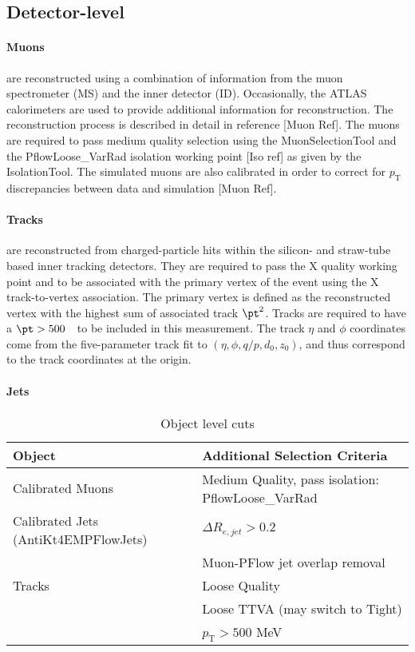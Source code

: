\subsection{Detector-level}

\paragraph{Muons} are reconstructed using a combination of information from the muon spectrometer (MS) and the inner detector (ID). Occasionally, the ATLAS calorimeters are used to provide additional information for reconstruction. The reconstruction process is described in detail in reference [Muon Ref].
The muons are required to pass medium quality selection using the MuonSelectionTool and the PflowLoose\_VarRad isolation working point [Iso ref] as given by the IsolationTool. The simulated muons are also calibrated in order to correct for $p_\text{T}$ discrepancies between data and simulation [Muon Ref].

\paragraph{Tracks} are reconstructed from charged-particle hits within the silicon- and straw-tube based inner tracking detectors. They are required to pass the X quality working point and to be associated with the primary vertex of the event using the X track-to-vertex association.  The primary vertex is defined  as the reconstructed vertex with the highest sum of associated track $\pt^2$.  Tracks are required to have a $\pt>500$~\MeV~to be included in this measurement.  The track $\eta$ and $\phi$ coordinates come from the five-parameter track fit to $(\eta,\phi,q/p,d_0,z_0)$, and thus correspond to the track coordinates at the origin.

\paragraph{Jets}

\begin{table}[h!]
    \centering
    \begin{tabular}{l|l}
    \hline
     \textbf{Object} & \textbf{Additional Selection Criteria} \\ \hline
     Calibrated Muons & Medium Quality, pass isolation: PflowLoose\_VarRad \\ \hline
     Calibrated Jets (AntiKt4EMPFlowJets) & $\Delta R_{e,jet} > 0.2$ \\
      & Muon-PFlow jet overlap removal \\ \hline
     Tracks & Loose Quality \\
      & Loose TTVA (may switch to Tight) \\
      & $p_{\text{T}} > 500$ MeV \\ \hline
    \end{tabular}
    \caption{Object level cuts}
    \label{tab:ObjCuts}
\end{table}


